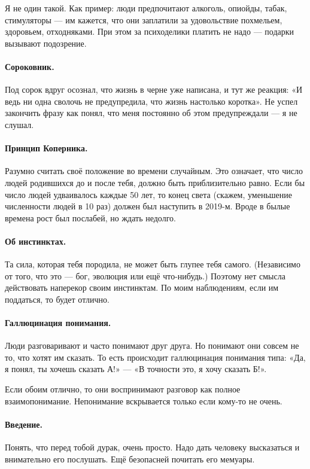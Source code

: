 \documentclass{book}
\begin{document}
Я не один такой.
Как пример: люди предпочитают алкоголь, опиойды, табак, стимуляторы --- им кажется, что они заплатили за удовольствие похмельем, здоровьем, отходняками.
При этом за психоделики платить не надо --- подарки вызывают подозрение.

\paragraph{Сороковник.}
Под сорок вдруг осознал, что жизнь в черне уже написана,
и тут же реакция: «И ведь ни одна сволочь не предупредила, что жизнь настолько коротка».
Не успел закончить фразу как понял, что меня постоянно об этом предупреждали --- я не слушал.

\paragraph{Принцип Коперника.}
Разумно считать своё положение во времени случайным.
Это означает, что число людей родившихся до и после тебя, должно быть приблизительно равно.
Если бы число людей удваивалось каждые 50 лет, то конец света (скажем, уменьшение численности людей в 10 раз) должен был наступить в 2019-м.
Вроде в былые времена рост был послабей, но ждать недолго.

\paragraph{Об инстинктах.}
Та сила, которая тебя породила, не может быть глупее тебя самого.
(Независимо от того, что это --- бог, эволюция или ещё что-нибудь.)
Поэтому нет смысла действовать наперекор своим инстинктам.
По моим наблюдениям, если им поддаться, то будет отлично. 

\paragraph{Галлюцинация понимания.}
Люди разговаривают и часто понимают друг друга.
Но понимают они совсем не то, что хотят им сказать.
То есть происходит галлюцинация понимания типа: «Да, я понял, ты хочешь сказать А!» --- «В точности это, я хочу сказать Б!».

Если обоим отлично, то они воспринимают разговор как полное взаимопонимание.
Непонимание вскрывается только если кому-то не очень.

\paragraph{Введение.}
Понять, что перед тобой дурак, очень просто.
Надо дать человеку высказаться и внимательно его послушать.
Ещё безопасней почитать его мемуары.
\end{document}
